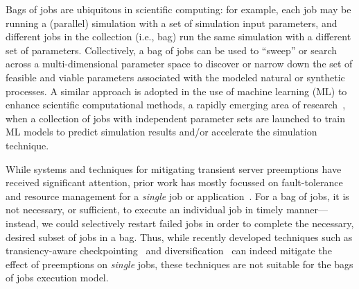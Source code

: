 
Bags of jobs are ubiquitous in scientific computing: for example, each job may be running a (parallel) simulation with a set of simulation input parameters, and different jobs in the collection (i.e., bag) run the same simulation with a different set of  parameters. 
Collectively, a bag of jobs can be used to ``sweep'' or search across a multi-dimensional parameter space to discover or narrow down the set of feasible and viable parameters associated with the modeled natural or synthetic processes.
A similar approach is adopted in the use of machine learning (ML) to enhance scientific computational methods, a rapidly emerging area of research~\cite{ml.atomic2017,melko2017,sam2017,fu2017,long2015machine, ferguson2017machine,ward2018matminer}, when a collection of jobs with independent parameter sets are launched to train ML models to predict simulation results and/or accelerate the simulation technique. 



While systems and techniques for mitigating transient server preemptions have received significant attention, prior work has mostly focussed on fault-tolerance and resource management for a \emph{single} job or application~\cite{spoton, exosphere, flint, marathe2014exploiting}. 
For a bag of jobs, it is not necessary, or sufficient, to execute an individual job in timely manner---instead, we could selectively restart failed jobs in order to complete the necessary, desired subset of jobs in a bag.
Thus, while recently developed techniques such as transiency-aware checkpointing~\cite{marathe2014exploiting, flint}
and diversification~\cite{exosphere, spotweb} can indeed mitigate the effect of preemptions on \emph{single} jobs, these techniques are not suitable for the bags of jobs execution model. 


